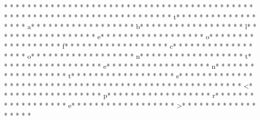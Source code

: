 * * *  * * *  * * *  *  * * *  *  * * *  * 	* * *  * * *  * * *  *  * * *  *  * * *  * 
* * *  * * *  * * *  *  * * *  *  * * *  * 	* * *  * * *  * * *  *  * * *  *  * * *  * t* * *  * * *  * * *  *  * * *  *  * * *  * a* * *  * * *  * * *  *  * * *  *  * * *  * b* * *  * * *  * * *  *  * * *  *  * * *  * l* * *  * * *  * * *  *  * * *  *  * * *  * e* * *  * * *  * * *  *  * * *  *  * * *  * o* * *  * * *  * * *  *  * * *  *  * * *  * f* * *  * * *  * * *  *  * * *  *  * * *  * c* * *  * * *  * * *  *  * * *  *  * * *  * o* * *  * * *  * * *  *  * * *  *  * * *  * n* * *  * * *  * * *  *  * * *  *  * * *  * t* * *  * * *  * * *  *  * * *  *  * * *  * e* * *  * * *  * * *  *  * * *  *  * * *  * n* * *  * * *  * * *  *  * * *  *  * * *  * t* * *  * * *  * * *  *  * * *  *  * * *  * s* * *  * * *  * * *  *  * * *  *  * * *  * 
* * *  * * *  * * *  *  * * *  *  * * *  * 	* * *  * * *  * * *  *  * * *  *  * * *  * <* * *  * * *  * * *  *  * * *  *  * * *  * p* * *  * * *  * * *  *  * * *  *  * * *  * r* * *  * * *  * * *  *  * * *  *  * * *  * e* * *  * * *  * * *  *  * * *  *  * * *  * >* * *  * * *  * * *  *  * * *  *  * * *  * 
